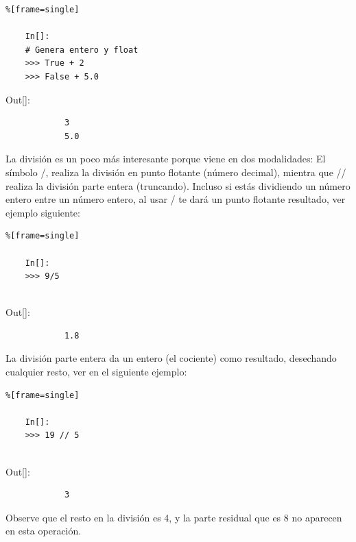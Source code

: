 \begin{lstlisting}%[frame=single]
	
	In[]:
	# Genera entero y float
	>>> True + 2
	>>> False + 5.0
\end{lstlisting}

{\ttfamily\scriptsize\scriptsize 
	\hspace{-0.65cm}Out[]:\vspace{-0.15cm}	
	{\color{blue}		
		\begin{verbatim}
			3
			5.0
		\end{verbatim}
}}


La división es un poco más interesante porque viene en dos modalidades:
\hfill  El símbolo  {\ttfamily /}, realiza la división en  punto flotante (número decimal), mientra que {\ttfamily //} realiza la división  parte entera (truncando). Incluso si estás dividiendo un número entero entre un número entero, al usar {\ttfamily /} te dará un punto flotante resultado, ver ejemplo siguiente:

\begin{lstlisting}%[frame=single]
	
	In[]:
	>>> 9/5
	
\end{lstlisting}

{\ttfamily\scriptsize\scriptsize 
	\hspace{-0.65cm}Out[]:\vspace{-0.15cm}	
	{\color{blue} 	
		\begin{verbatim}
			1.8
		\end{verbatim}
}}


La división parte entera da un entero (el cociente) como resultado, desechando cualquier resto, ver en el siguiente ejemplo:

\begin{lstlisting}%[frame=single]
	
	In[]:
	>>> 19 // 5
	
\end{lstlisting}

{\ttfamily\scriptsize\scriptsize 
	\hspace{-0.65cm}Out[]:	
	{\color{blue} 	
		\begin{verbatim}
			3
		\end{verbatim}
}}

\hspace{-0.65cm}Observe que el resto en la división es 4, y la parte residual que
es 8 no aparecen en esta operación.\\

